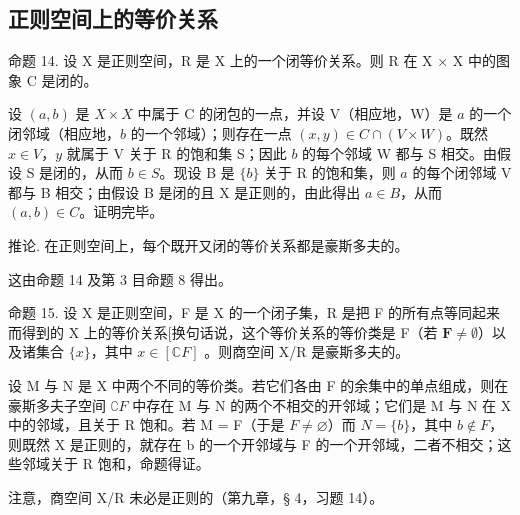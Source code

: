 \subsection{正则空间上的等价关系}

命题 14. 设 X 是正则空间，R 是 X 上的一个闭等价关系。则 R 在 X × X 中的图象 C 是闭的。

设 \((a, b)\) 是 \(X \times X\) 中属于 C 的闭包的一点，并设 V（相应地，W）是 \(a\) 的一个闭邻域（相应地，\(b\) 的一个邻域）；则存在一点 \((x, y) \in C \cap (V \times W)\)。既然 \(x \in V\)，\(y\) 就属于 V 关于 R 的饱和集 S；因此 \(b\) 的每个邻域 W 都与 S 相交。由假设 S 是闭的，从而 \(b \in S\)。现设 B 是 \(\{b\}\) 关于 R 的饱和集，则 \(a\) 的每个闭邻域 V 都与 B 相交；由假设 B 是闭的且 X 是正则的，由此得出 \(a \in B\)，从而 \((a, b) \in C\)。证明完毕。

推论. 在正则空间上，每个既开又闭的等价关系都是豪斯多夫的。

这由命题 14 及第 3 目命题 8 得出。

命题 15. 设 X 是正则空间，F 是 X 的一个闭子集，R 是把 F 的所有点等同起来而得到的 X 上的等价关系{[}换句话说，这个等价关系的等价类是 F（若 \(\mathbf{F} \neq \emptyset\)）以及诸集合 \(\{x\}\)，其中 \(x \in [\mathbb{C}F]\) 。则商空间 X/R 是豪斯多夫的。

设 M 与 N 是 X 中两个不同的等价类。若它们各由 F 的余集中的单点组成，则在豪斯多夫子空间 \(\complement F\) 中存在 M 与 N 的两个不相交的开邻域；它们是 M 与 N 在 X 中的邻域，且关于 R 饱和。若 M = F（于是 \(F \neq \varnothing\)）而 \(N = \{b\}\)，其中 \(b \notin F\)，则既然 X 是正则的，就存在 b 的一个开邻域与 F 的一个开邻域，二者不相交；这些邻域关于 R 饱和，命题得证。

注意，商空间 X/R 未必是正则的（第九章，§ 4，习题 14）。

